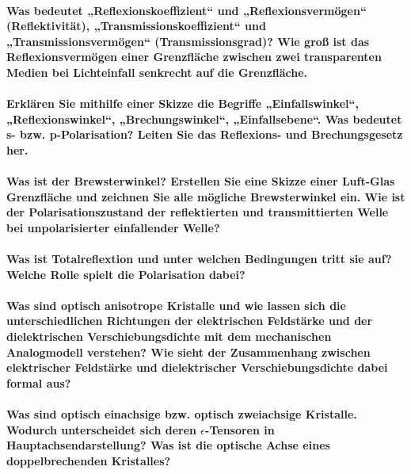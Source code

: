 \documentclass[a4paper, 11pt, parskip=half]{scrartcl}
\begin{document}
\paragraph{Was bedeutet „Reflexionskoeffizient“ und „Reflexionsvermögen“ (Reflektivität),
„Transmissionskoeffizient“ und „Transmissionsvermögen“ (Transmissionsgrad)? Wie groß ist das
Reflexionsvermögen einer Grenzfläche zwischen zwei transparenten Medien bei Lichteinfall senkrecht
auf die Grenzfläche.}

\paragraph{Erklären Sie mithilfe einer Skizze die Begriffe „Einfallswinkel“, „Reflexionswinkel“, „Brechungswinkel“, „Einfallsebene“. Was bedeutet s- bzw. p-Polarisation? Leiten Sie das Reflexions-
und Brechungsgesetz her.}

\paragraph{Was ist der Brewsterwinkel? Erstellen Sie eine Skizze einer Luft-Glas Grenzfläche und
zeichnen Sie alle mögliche Brewsterwinkel ein. Wie ist der Polarisationszustand der reflektierten
und transmittierten Welle bei unpolarisierter einfallender Welle?}

\paragraph{Was ist Totalreflextion und unter welchen Bedingungen tritt sie auf? Welche Rolle spielt
die Polarisation dabei?}

\paragraph{Was sind optisch anisotrope Kristalle und wie lassen sich die unterschiedlichen
Richtungen der elektrischen Feldstärke und der dielektrischen Verschiebungsdichte mit dem
mechanischen Analogmodell verstehen? Wie sieht der Zusammenhang zwischen elektrischer Feldstärke und dielektrischer Verschiebungsdichte dabei formal aus?}

\paragraph{Was sind optisch einachsige bzw. optisch zweiachsige Kristalle. Wodurch unterscheidet
sich deren $\epsilon$-Tensoren in Hauptachsendarstellung? Was ist die optische Achse eines
doppelbrechenden Kristalles?}
\end{document}

